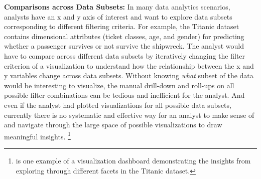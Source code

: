 \npar \textbf{Comparisons across Data Subsets:} In many data analytics scenarios, analysts have an x and y axis of interest and want to explore data subsets corresponding to different filtering criteria. For example, the Titanic dataset contains dimensional attributes (ticket classes, age, and gender) for predicting whether a passenger survives or not survive the shipwreck. The analyst would have to compare across different data subsets by iteratively changing the filter criterion of a visualization to understand how the relationship between the x and y variables change across data subsets.
\npar Without knowing \textit{what} subset of the data would be interesting to visualize, the manual drill-down and roll-ups on all possible filter combinations can be tedious and inefficient for the analyst. And even if the analyst had plotted visualizations for all possible data subsets, currently there is no systematic and effective way for an analyst to make sense of and navigate through the large space of possible visualizations to draw meaningful insights. \footnote{\cite{anand} is one example of a visualization dashboard demonstrating the insights from exploring through different facets in the Titanic dataset.}

